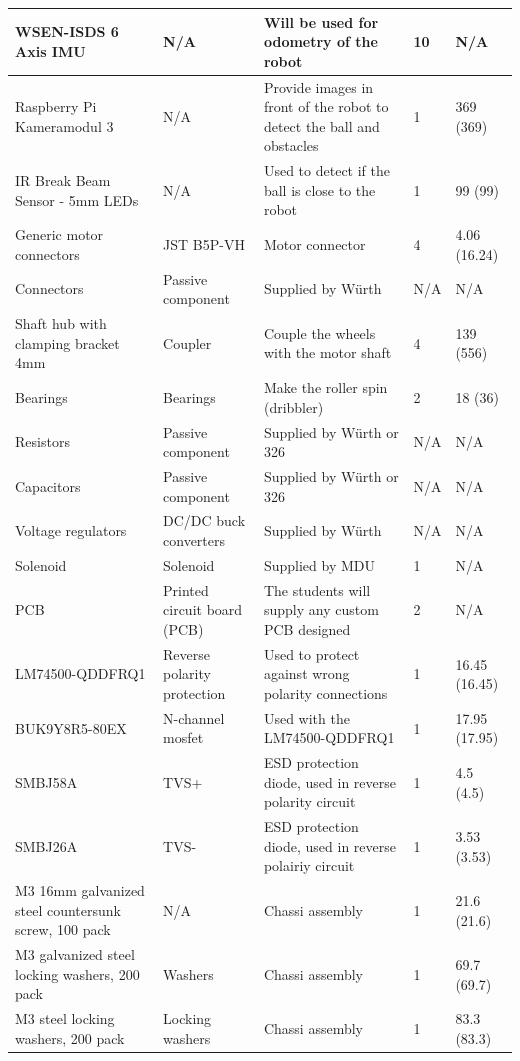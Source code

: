 \documentclass[a4paper,8pt]{article}
\begin{document}
\begin{small}
\begin{longtable}{|p{3cm}|p{3cm}|p{3cm}|p{1cm}|p{3cm}| }
      WSEN-ISDS 6 Axis IMU & N/A & Will be used for odometry of the robot & 10 & N/A\\ \hline 
      Raspberry Pi Kameramodul 3 & N/A & Provide images in front of the robot to detect the ball and obstacles & 1 & 369 (369) \\ \hline 
      IR Break Beam Sensor - 5mm LEDs & N/A & Used to detect if the ball is close to the robot & 1 & 99 (99) \\ \hline 
      Generic motor connectors & JST B5P-VH & Motor connector & 4 & 4.06 (16.24) \\ \hline
      Connectors & Passive component & Supplied by Würth & N/A & N/A \\ \hline 
      Shaft hub with clamping bracket 4mm & Coupler & Couple the wheels with the motor shaft & 4 & 139 (556) \\ \hline 
      Bearings & Bearings & Make the roller spin (dribbler) & 2 & 18 (36)\\ \hline
      Resistors & Passive component & Supplied by Würth or 326 & N/A & N/A \\ \hline 
      Capacitors & Passive component & Supplied by Würth or 326 & N/A & N/A \\ \hline 
      Voltage regulators & DC/DC buck converters & Supplied by Würth & N/A & N/A \\ \hline 
      Solenoid & Solenoid & Supplied by MDU & 1 & N/A \\ \hline 
      PCB & Printed circuit board (PCB) & The students will supply any custom PCB designed & 2 & N/A\\ \hline 
      LM74500\break-QDDFRQ1 & Reverse polarity protection & Used to protect against wrong polarity connections & 1 & 16.45 (16.45) \\ \hline 
      BUK9Y8R5-80EX & N-channel mosfet & Used with the LM74500\break-QDDFRQ1 & 1 & 17.95 (17.95) \\ \hline 
      SMBJ58A & TVS+ & ESD protection diode, used in reverse polarity circuit & 1 & 4.5 (4.5) \\ \hline 
      SMBJ26A & TVS- & ESD protection diode, used in reverse polairiy circuit & 1 & 3.53 (3.53) \\ \hline
      M3 16mm galvanized steel countersunk screw, 100 pack & N/A & Chassi assembly & 1 & 21.6 (21.6) \\ \hline
      M3 galvanized steel locking washers, 200 pack & Washers & Chassi assembly & 1 & 69.7 (69.7) \\ \hline
      M3 steel locking washers, 200 pack & Locking washers & Chassi assembly & 1 & 83.3 (83.3) \\ \hline

\end{longtable}
\end{small}
\end{document}
